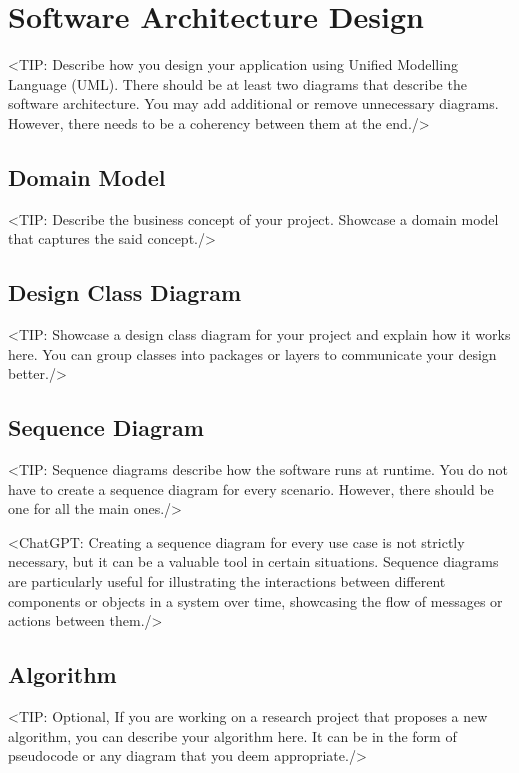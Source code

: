 \chapter{Software Architecture Design}
\label{chap:software-architecture-design}
<TIP: Describe how you design your application using Unified Modelling
Language (UML). There should be at least two diagrams that describe the
software architecture. You may add additional or remove unnecessary diagrams.
However, there needs to be a coherency between them at the end./>

\section{Domain Model}
\label{section:domain-model}
<TIP: Describe the business concept of your project. Showcase a
domain model that captures the said concept./>

\section{Design Class Diagram}
\label{section:design-class-diagram}
<TIP: Showcase a design class diagram for your project and explain
how it works here. You can group classes into packages or layers to communicate your
design better./>

\section{Sequence Diagram}
\label{section:sequence-diagram}
<TIP: Sequence diagrams describe how the software runs at runtime.
You do not have to create a sequence diagram for every scenario. However,
there should be one for all the main ones./>

<ChatGPT: Creating a sequence diagram for every use case is not
strictly necessary, but it can be a valuable tool in certain situations. Sequence
diagrams are particularly useful for illustrating the interactions between different
components or objects in a system over time, showcasing the flow of messages
or actions between them./>

\section{Algorithm}
\label{section:algorithm}
<TIP: Optional, If you are working on a research project that proposes a new
algorithm, you can describe your algorithm here. It can be in the form of
pseudocode or any diagram that you deem appropriate./>

